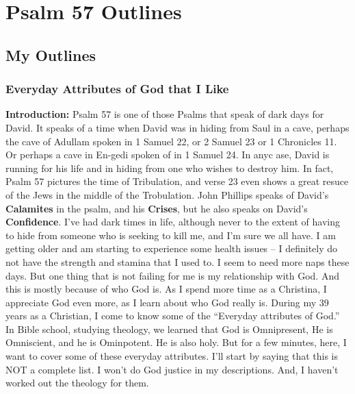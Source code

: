 \section{Psalm 57 Outlines}

\subsection{My Outlines}

\subsubsection{Everyday Attributes of God that I Like}
\textbf{Introduction:} Psalm 57 is one of those Psalms that speak of dark days for David. It speaks of a time when David was in hiding from Saul in a cave, perhaps the cave of Adullam spoken in 1 Samuel 22, or 2 Samuel 23 or 1 Chronicles 11.  Or perhaps a cave in En-gedi spoken of in 1 Samuel 24. In anyc ase, David is running for his life and in hiding from one who wishes to destroy him.  In fact, Psalm 57 pictures the time of Tribulation, and verse 23 even shows a great resuce of the Jews in the middle of the Trobulation. John Phillips speaks of David's \textbf{Calamites} in the psalm, and his \textbf{Crises}, but he also speaks on David's \textbf{Confidence}.\cite{Phillips2001PsalmsV1} I've had dark times in life, although never to the extent of having to hide from someone who is seeking to kill me, and I'm sure we all have. I am getting older and am starting to experience some health issues -- I definitely do not have the strength and stamina that I used to. I seem to need more naps these days. But one thing that is not failing for me is my relationship with God. And this is mostly because of who God is.  As I spend more time as a Christina, I appreciate God even more, as I learn about who God really is. During my 39 years as a Christian, I come to know some of the ``Everyday attributes of God.'' In Bible school, studying theology, we learned that God is Omnipresent, He is Omniscient, and he is Ominpotent.  He is also holy. But for a few minutes, here, I want to cover some of these everyday attributes. I'll start by saying that this is NOT a complete list. I won't do God justice in my descriptions. And, I haven't worked out the theology for them.
